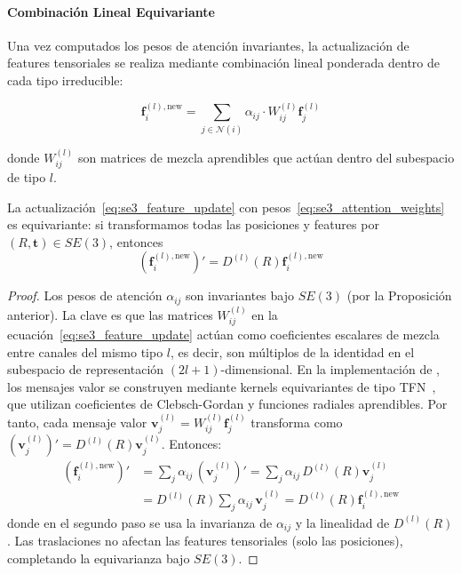 \paragraph{Combinación Lineal Equivariante}

Una vez computados los pesos de atención invariantes, la actualización de features tensoriales se realiza mediante combinación lineal ponderada dentro de cada tipo irreducible:

\begin{equation}\label{eq:se3_feature_update}
\mathbf{f}_i^{(l), \text{new}} = \sum_{j \in \mathcal{N}(i)} \alpha_{ij} \cdot W_{ij}^{(l)} \mathbf{f}_j^{(l)}
\end{equation}

donde $W_{ij}^{(l)}$ son matrices de mezcla aprendibles que actúan dentro del subespacio de tipo $l$.

\begin{theorem}\label{thm:se3_transformer_equivariance}
La actualización~\eqref{eq:se3_feature_update} con pesos~\eqref{eq:se3_attention_weights} es equivariante: si transformamos todas las posiciones y features por $(R, \mathbf{t}) \in SE(3)$, entonces
\begin{equation}
(\mathbf{f}_i^{(l), \text{new}})' = D^{(l)}(R) \mathbf{f}_i^{(l), \text{new}}
\end{equation}
\end{theorem}

\begin{proof}
Los pesos de atención $\alpha_{ij}$ son invariantes bajo $SE(3)$ (por la Proposición anterior). La clave es que las matrices $W_{ij}^{(l)}$ en la ecuación~\eqref{eq:se3_feature_update} actúan como coeficientes escalares de mezcla entre canales del mismo tipo $l$, es decir, son múltiplos de la identidad en el subespacio de representación $(2l+1)$-dimensional. En la implementación de \citet{fuchs2020se3transformers}, los mensajes valor se construyen mediante kernels equivariantes de tipo TFN~\citep{thomas2018tensorfieldnetworks}, que utilizan coeficientes de Clebsch-Gordan y funciones radiales aprendibles. Por tanto, cada mensaje valor $\mathbf{v}_j^{(l)} = W_{ij}^{(l)} \mathbf{f}_j^{(l)}$ transforma como $(\mathbf{v}_j^{(l)})' = D^{(l)}(R) \mathbf{v}_j^{(l)}$. Entonces:
\begin{align}
(\mathbf{f}_i^{(l), \text{new}})' &= \sum_j \alpha_{ij} \, (\mathbf{v}_j^{(l)})' = \sum_j \alpha_{ij} \, D^{(l)}(R) \mathbf{v}_j^{(l)} \\
&= D^{(l)}(R) \sum_j \alpha_{ij} \, \mathbf{v}_j^{(l)} = D^{(l)}(R) \mathbf{f}_i^{(l), \text{new}}
\end{align}
donde en el segundo paso se usa la invarianza de $\alpha_{ij}$ y la linealidad de $D^{(l)}(R)$. Las traslaciones no afectan las features tensoriales (solo las posiciones), completando la equivarianza bajo $SE(3)$.
\end{proof}

